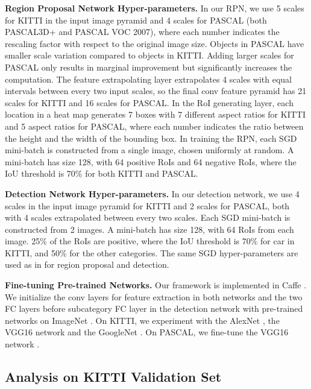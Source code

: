 \documentclass[10pt,twocolumn,letterpaper]{article}
\begin{document}
\noindent \textbf{Region Proposal Network Hyper-parameters.} In our RPN, we use 5 scales for KITTI in the input image pyramid  and 4 scales for PASCAL  (both PASCAL3D+ and PASCAL VOC 2007), where each number indicates the rescaling factor with respect to the original image size. Objects in PASCAL have smaller scale variation compared to objects in KITTI. Adding larger scales for PASCAL only results in marginal improvement but significantly increases the computation. The feature extrapolating layer extrapolates 4 scales with equal intervals between every two input scales, so the final conv feature pyramid has 21 scales for KITTI and 16 scales for PASCAL. In the RoI generating layer, each location in a heat map generates 7 boxes with 7 different aspect ratios  for KITTI and 5 aspect ratios  for PASCAL, where each number indicates the ratio between the height and the width of the bounding box. In training the RPN, each SGD mini-batch is constructed from a single image, chosen uniformly at random. A mini-batch has size 128, with 64 positive RoIs and 64 negative RoIs, where the IoU threshold is 70\% for both KITTI and PASCAL.

\noindent \textbf{Detection Network Hyper-parameters.} In our detection network, we use 4 scales in the input image pyramid  for KITTI and 2 scales  for PASCAL, both with 4 scales extrapolated between every two scales. Each SGD mini-batch is constructed from 2 images. A mini-batch has size 128, with 64 RoIs from each image. 25\% of the RoIs are positive, where the IoU threshold is 70\% for car in KITTI, and 50\% for the other categories. The same SGD hyper-parameters are used as in \cite{girshick2015fast} for region proposal and detection.

\noindent \textbf{Fine-tuning Pre-trained Networks.} Our framework is implemented in Caffe \cite{jia2014caffe}. We initialize the conv layers for feature extraction in both networks and the two FC layers before subcategory FC layer in the detection network with pre-trained networks on ImageNet \cite{ILSVRC15}. On KITTI, we experiment with the AlexNet \cite{krizhevsky2012imagenet}, the VGG16 network \cite{simonyan2014very} and the GoogleNet \cite{googlenet}. On PASCAL, we fine-tune the VGG16 network \cite{simonyan2014very}. 

\subsection{Analysis on KITTI Validation Set}
\end{document}

